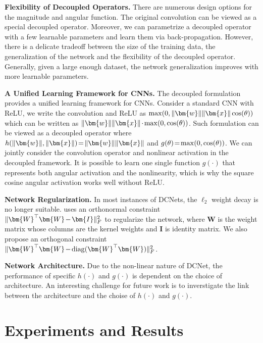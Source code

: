 \textbf{Flexibility of Decoupled Operators.} There are numerous design options for the magnitude and angular function. The original convolution can be viewed as a special decoupled operator. Moreover, we can parametrize a decoupled operator with a few learnable parameters and learn them via back-propagation. However, there is a delicate tradeoff between the size of the training data, the generalization of the network and the flexibility of the decoupled operator. Generally, given a large enough dataset, the network generalization improves with more learnable parameters.
\par

\textbf{A Unified Learning Framework for CNNs.} The decoupled formulation provides a unified learning framework for CNNs. Consider a standard CNN with ReLU, we write the convolution and ReLU as $\thickmuskip=2mu \medmuskip=2mu \max(0,\|\bm{w}\|\|\bm{x}\|\cos(\theta))$ which can be written as $\thickmuskip=2mu \medmuskip=2mu \|\bm{w}\|\|\bm{x}\|\cdot\max(0,\cos(\theta))$. Such formulation can be viewed as a decoupled operator where $\thickmuskip=2mu \medmuskip=2mu h(\|\bm{w}\|,\|\bm{x}\|)=\|\bm{w}\|\|\bm{x}\|$ and $\thickmuskip=2mu \medmuskip=2mu g(\theta)=\max(0,\cos(\theta))$. We can jointly consider the convolution operator and nonlinear activation in the decoupled framework. It is possible to learn one single function $g(\cdot)$ that represents both angular activation and the nonlinearity, which is why the square cosine angular activation works well without ReLU.
\par

\textbf{Network Regularization.} In most instances of  DCNets, the $\ell_2$ weight decay is no longer suitable. \cite{liu2017deephyper} uses an orthonormal constraint $\thickmuskip=2mu \medmuskip=2mu \|\bm{W}^\top\bm{W}-\bm{I}\|_F^2$ to regularize the network, where $\bm{W}$ is the weight matrix whose columns are the kernel weights and $\bm{I}$ is identity matrix. We also propose an orthogonal constraint $\thickmuskip=2mu \medmuskip=2mu \|\bm{W}^\top\bm{W}-\mathop{\mathrm{diag}}(\bm{W}^\top\bm{W})\|_F^2$.
\par

\textbf{Network Architecture.} Due to the non-linear nature of DCNet, the performance of specific $h(\cdot)$ and $g(\cdot)$ is dependent on the choice of architecture. An interesting challenge for future work is to inverstigate the link between the architecture and the choise of $h(\cdot)$ and $g(\cdot)$.

\section{Experiments and Results}

